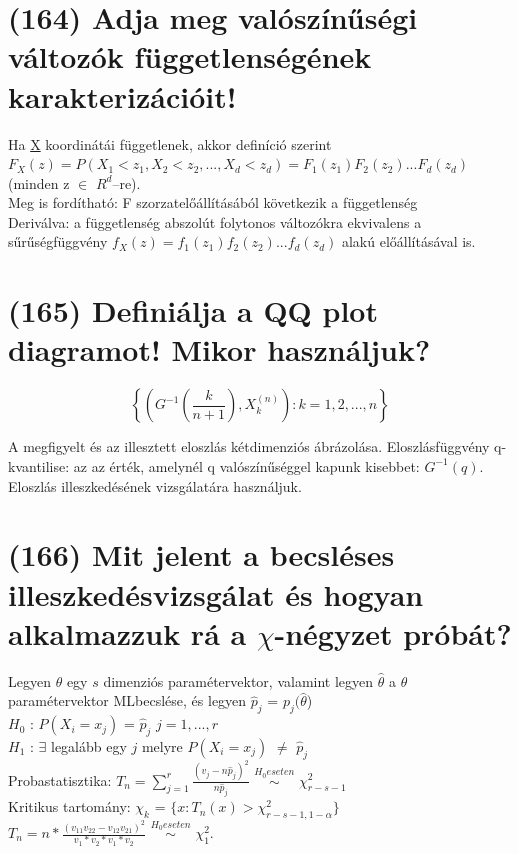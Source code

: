 \documentclass[12p]{article}
\begin{document}
\section{(164) Adja meg valószínűségi változók függetlenségének karakterizációit!}

Ha \underline{X} koordinátái függetlenek, akkor definíció szerint\\
$F_X(z)=P(X_1<z_1, X_2< z_2,..., X_d<z_d)=F_1(z_1)F_2(z_2)...F_d(z_d)$ (minden z $\in$ $R^d$–re).\\
Meg is fordítható: F szorzatelőállításából következik a függetlenség\\
Deriválva: a függetlenség abszolút folytonos változókra ekvivalens a sűrűségfüggvény 
$f_X(z)=f_1(z_1)f_2(z_2)...f_d(z_d)$ alakú előállításával is.

\section{(165) Definiálja a QQ plot diagramot! Mikor használjuk?}

$$\left\{\left(G^{-1}\left(\frac{k}{n+1}\right), X_k^{(n)}\right):k=1,2,...,n\right\}$$

A megfigyelt és az illesztett eloszlás kétdimenziós ábrázolása. Eloszlásfüggvény q-kvantilise: az az érték, amelynél q valószínűséggel kapunk kisebbet: $G^{-1}(q)$.\\
Eloszlás illeszkedésének vizsgálatára használjuk.

\section{(166) Mit jelent a becsléses illeszkedésvizsgálat és hogyan alkalmazzuk rá a $\chi$-négyzet próbát?}

Legyen $\theta$ egy $s$ dimenziós paramétervektor, valamint legyen $\hat{\theta}$ a $\theta$ paramétervektor MLbecslése, és legyen $\hat{p}_j$ = $p_j (\hat{\theta}$)\\
$H_0$ : $P(X_i = x_j)$ = $\hat{p}_j$ $j = 1,. . . , r$\\
$H_1$ : $\exists$ legalább egy $j$ melyre $P(X_i = x_j)$ $\neq$ $\hat{p}_j$\\
Probastatisztika: $T_n = \displaystyle{\sum_{j=1}^{r}}\frac{(v_j - n\hat{p}_j)^2}{n\hat{p}_j}$ $\stackrel{H_0 eseten}{\sim}$ $\chi^2_{r-s-1}$\\
Kritikus tartomány: $\chi_k$ = $\{x: T_n(x) > \chi^2_{r-s-1,1-\alpha}\}$\\
$T_n = n * \frac{(v_{11}v_{22} - v_{12}v_{21})^2}{v_1 * v_2 * v_1 * v_2}$ $\stackrel{H_0 eseten}{\sim}$ $\chi^2_1$.
\end{document}
